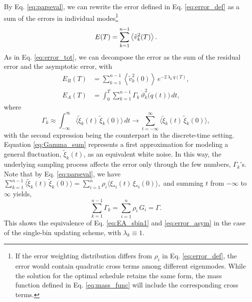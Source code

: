 \documentclass[reprint, superscriptaddress, floatfix]{revtex4-1}
\newcommand{\Err}{E}
\begin{document}
By Eq. \eqref{eq:parseval},
we can rewrite the error defined in Eq. \eqref{eq:error_def} as
a sum of the errors in individual modes\footnote{If
the error weighting distribution differs from $\rho_i$
in Eq. \eqref{eq:error_def},
the error would contain quadratic cross terms among different eigenmodes.
%
While the solution for the optimal schedule retains the same form,
the mass function defined in Eq. \eqref{eq:mass_func}
will include the corresponding cross terms.
}
%
\begin{align}
  \Err(T)
  =
  \sum_{k = 1}^{n - 1}
    \left\langle
      {\tilde v}_k^2(T)
    \right\rangle
  .
  \notag
\end{align}
%
As in Eq. \eqref{eq:error_tot},
we can decompose the error as the sum
of the residual error and the asymptotic error, with
\begin{align}
  \Err_R(T)
  &=
  \sum_{k = 1}^{n-1}
    \left\langle
      {\tilde v}_k^2(0)
    \right\rangle \,
    e^{ - 2 \, \lambda_k  \, q(T) }
  ,
  \label{eq:error_res}
  \\
  \Err_A(T)
  &=
  \int_0^T
  \sum_{k = 1}^{n-1}
  \Gamma_k \, \dot \vartheta_k^2\bigl( q(t) \bigr) \, dt
  ,
  \label{eq:error_asym}
\end{align}
%
where
%
%
\begin{equation}
  \Gamma_k
  \approx
  \int_{-\infty}^\infty
  \bigl\langle
    \tilde\xi_k(t) \, \tilde\xi_k(0)
  \bigr\rangle
  \, dt
  \to
  \sum_{t = -\infty}^\infty
  \bigl\langle
    \tilde\xi_k(t) \, \tilde\xi_k(0)
  \bigr\rangle
  ,
  \label{eq:Gamma_sum}
\end{equation}
%
with the second expression being
the counterpart in the discrete-time setting.
%
Equation \eqref{eq:Gamma_sum} represents
a first approximation for modeling
a general fluctuation, ${\tilde \xi}_k(t)$,
as an equivalent white noise.
In this way,
the underlying sampling process
affects the error only through the
few numbers, $\Gamma_k$'s.
%
Note that by Eq. \eqref{eq:parseval}, we have
$\sum_{k=1}^{n-1} \bigl\langle {\tilde \xi}_k(t) \, {\tilde \xi}_k(0) \bigr\rangle
= \sum_{i=1}^n \rho_i \bigl\langle \xi_{*i}(t) \, \xi_{*i}(0) \bigr\rangle,$
and summing $t$ from $-\infty$ to $\infty$ yields,
\begin{equation}
  \sum_{k=1}^{n-1} \Gamma_k = \sum_{i=1}^n \rho_i \, G_i = \Gamma
  .
  \label{eq:Gammak_sum}
\end{equation}
This shows the equivalence of
Eq. \eqref{eq:EA_sbin1} and \eqref{eq:error_asym}
in the case of the single-bin updating scheme, with $\lambda_k \equiv 1$.
%
\end{document}
